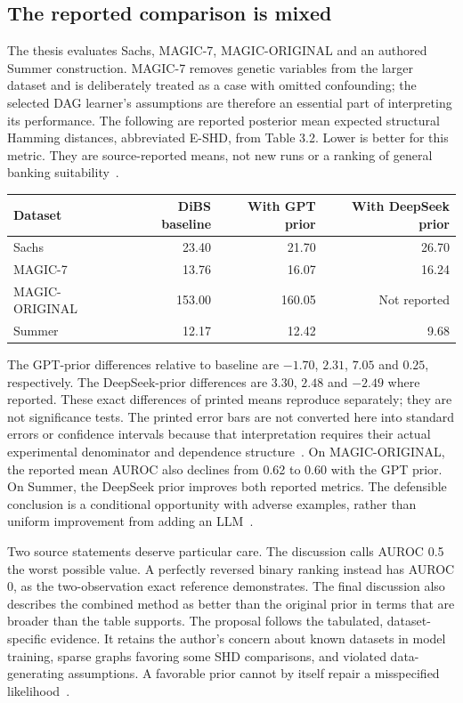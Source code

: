 \subsection{The reported comparison is mixed}
The thesis evaluates Sachs, MAGIC-7, MAGIC-ORIGINAL and an authored Summer construction. MAGIC-7 removes genetic variables from the larger dataset and is deliberately treated as a case with omitted confounding; the selected DAG learner's assumptions are therefore an essential part of interpreting its performance. The following are reported posterior mean expected structural Hamming distances, abbreviated E-SHD, from Table 3.2. Lower is better for this metric. They are source-reported means, not new runs or a ranking of general banking suitability~\citep{exec18_videira_thesis}.

\begin{center}
\begin{tabular}{lrrr}
\toprule
Dataset & DiBS baseline & With GPT prior & With DeepSeek prior\\
\midrule
Sachs &23.40&21.70&26.70\\
MAGIC-7 &13.76&16.07&16.24\\
MAGIC-ORIGINAL &153.00&160.05&Not reported\\
Summer &12.17&12.42&9.68\\
\bottomrule
\end{tabular}
\end{center}

The GPT-prior differences relative to baseline are $-1.70$, $2.31$, $7.05$ and $0.25$, respectively. The DeepSeek-prior differences are $3.30$, $2.48$ and $-2.49$ where reported. These exact differences of printed means reproduce separately; they are not significance tests. The printed error bars are not converted here into standard errors or confidence intervals because that interpretation requires their actual experimental denominator and dependence structure~\citep{exec18_bayesian_reference}. On MAGIC-ORIGINAL, the reported mean AUROC also declines from 0.62 to 0.60 with the GPT prior. On Summer, the DeepSeek prior improves both reported metrics. The defensible conclusion is a conditional opportunity with adverse examples, rather than uniform improvement from adding an LLM~\citep{exec18_videira_thesis}.

Two source statements deserve particular care. The discussion calls AUROC 0.5 the worst possible value. A perfectly reversed binary ranking instead has AUROC 0, as the two-observation exact reference demonstrates. The final discussion also describes the combined method as better than the original prior in terms that are broader than the table supports. The proposal follows the tabulated, dataset-specific evidence. It retains the author's concern about known datasets in model training, sparse graphs favoring some SHD comparisons, and violated data-generating assumptions. A favorable prior cannot by itself repair a misspecified likelihood~\citep{exec18_videira_thesis,exec18_bayesian_reference}.

